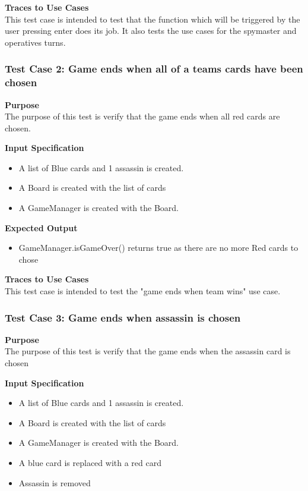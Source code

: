 \documentclass[12pt]{article}
\begin{document}
\noindent
{\bf Traces to Use Cases}\\
This test case is intended to test that the function which will be triggered by the user pressing enter does its job. It also tests the use cases for the spymaster and operatives turns.

\subsubsection{Test Case 2: Game ends when all of a teams cards have been chosen} \label{tc:2}

\noindent
{\bf Purpose}\\
The purpose of this test is verify that the game ends when all red cards are chosen.

\noindent
{\bf Input Specification}
\begin{itemize}
    \item A list of Blue cards and 1 assassin is created.
    \item A Board is created with the list of cards
    \item A GameManager is created with the Board.
\end{itemize}

\noindent
{\bf Expected Output}
\begin{itemize}
    \item GameManager.isGameOver() returns true as there are no more Red cards to chose
\end{itemize}

\noindent
{\bf Traces to Use Cases}\\
This test case is intended to test the "game ends when team wins" use case.

\subsubsection{Test Case 3: Game ends when assassin is chosen} \label{tc:2}

\noindent
{\bf Purpose}\\
The purpose of this test is verify that the game ends when the assassin card is chosen

\noindent
{\bf Input Specification}
\begin{itemize}
    \item A list of Blue cards and 1 assassin is created.
    \item A Board is created with the list of cards
    \item A GameManager is created with the Board.
    \item A blue card is replaced with a red card
    \item Assassin is removed
\end{itemize}
\end{document}
